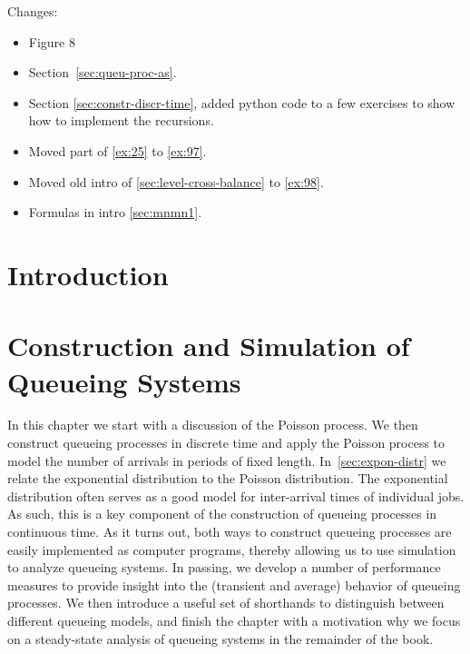 \author{Nicky D. van  Foreest}


\frontmatter
\maketitle

Changes:
\begin{itemize}
\item Figure 8
\item Section~\ref{sec:queu-proc-as}.
\item Section \ref{sec:constr-discr-time}, added python code to a few exercises to show how to implement the recursions.
\item Moved part of \cref{ex:25} to \cref{ex:97}.
\item Moved old intro of \cref{sec:level-cross-balance} to \cref{ex:98}.
\item Formulas in intro \cref{sec:mnmn1}.
\end{itemize}


\tableofcontents

\chapter{Introduction}
\label{cha:introduction}



\mainmatter

\chapter{Construction and Simulation of Queueing Systems}
\label{cha:single-stat-queu}

In this chapter we start with a discussion of the Poisson process.
We then construct queueing processes in discrete time and apply the Poisson process to model the number of arrivals in periods of fixed length.
In~\cref{sec:expon-distr} we relate the exponential distribution to the Poisson distribution.
The exponential distribution often serves as a good model for inter-arrival times of individual jobs.
As such, this is a key component of the construction of queueing processes in continuous time.
As it turns out, both ways to construct queueing processes are easily implemented as computer programs, thereby allowing us to use simulation to analyze queueing systems.
In passing, we develop a number of performance measures to provide insight into the (transient and average) behavior of queueing processes.
We then introduce a useful set of shorthands to distinguish between different queueing models, and finish the chapter with a motivation why we focus on a steady-state analysis of queueing systems in the remainder of the book.


